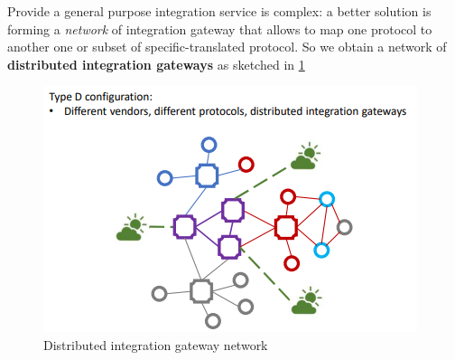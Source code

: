 \documentclass[10pt,a4paper]{report}
\theoremstyle{definition}
\begin{document}
Provide a general purpose integration service is complex: a better solution is forming a \textit{network} of integration gateway that allows to map one protocol to another one or subset of specific-translated protocol. So we obtain a network of \textbf{distributed integration gateways} as sketched in \ref{distribute-gateway}
\begin{figure}[h]
	\centering\includegraphics[scale=0.70]{images/Pasted image 20230228114110.png}
	\caption{Distributed integration gateway network}\label{distribute-gateway}\end{figure}
\end{document}
